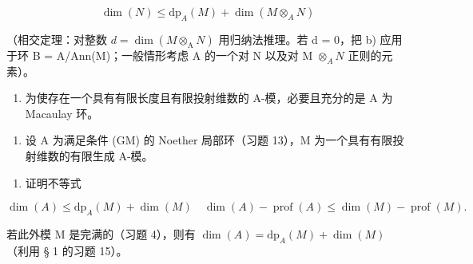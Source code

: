 \[
\dim (N) \leqslant \mathrm{dp} _ {A} (M) + \dim (M \otimes_ {A} N)
\]

（相交定理：对整数 \(d = \dim(M \otimes_{\mathrm{A}} N)\) 用归纳法推理。若 d = 0，把 b) 应用于环 B = A/Ann(M)；一般情形考虑 A 的一个对 N 以及对 M \(\otimes_{A} N\) 正则的元素）。

\begin{enumerate}
\def\labelenumi{\alph{enumi})}
\setcounter{enumi}{3}
\tightlist
\item
  为使存在一个具有有限长度且有限投射维数的 A-模，必要且充分的是 A 为 Macaulay 环。
\end{enumerate}

\begin{enumerate}
\def\labelenumi{\arabic{enumi})}
\setcounter{enumi}{13}
\tightlist
\item
  设 \(\mathrm{A}\) 为满足条件 (GM) 的 Noether 局部环（习题 13），M 为一个具有有限投射维数的有限生成 A-模。
\end{enumerate}

\begin{enumerate}
\def\labelenumi{\alph{enumi})}
\tightlist
\item
  证明不等式
\end{enumerate}

\[
\dim (A) \leqslant \mathrm{dp} _ {A} (M) + \dim (M) \quad \dim (A) - \operatorname{prof} (A) \leqslant \dim (M) - \operatorname{prof} (M).
\]

若此外模 M 是完满的（习题 4），则有 \(\dim(A) = \mathrm{dp}_{A}(M) + \dim(M)\) （利用 § 1 的习题 15）。

